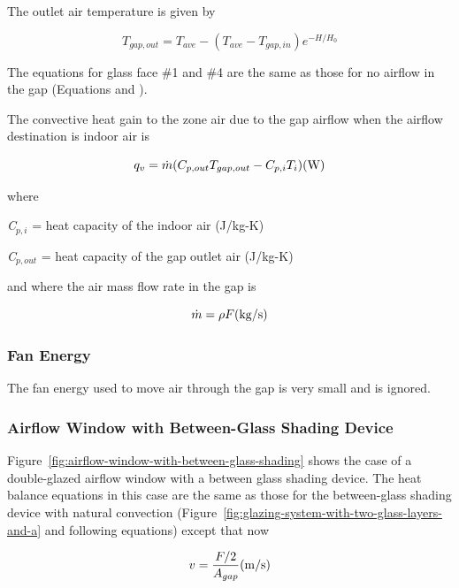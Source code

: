 The outlet air temperature is given by

\begin{equation}
{T_{gap,out}} = {T_{ave}} - ({T_{ave}} - {T_{gap,in}}){e^{ - H/{H_0}}}
\end{equation}

The equations for glass face \#1 and \#4 are the same as those for no airflow in the gap (Equations and ).

The convective heat gain to the zone air due to the gap airflow when the airflow destination is indoor air is

\begin{equation}
{q_v} = \dot m({C_{p,out}}{T_{gap,out}} - {C_{p,i}}{T_i}){\rm{      (W)}}
\end{equation}

where

\emph{C\(_{p,i}\)} = heat capacity of the indoor air (J/kg-K)

\emph{C\(_{p,out}\)} = heat capacity of the gap outlet air (J/kg-K)

and where the air mass flow rate in the gap is

\begin{equation}
\dot m = \rho F{\rm{      (kg/s)}}
\end{equation}

\subsubsection{Fan Energy}\label{fan-energy}

The fan energy used to move air through the gap is very small and is ignored.

\subsubsection{Airflow Window with Between-Glass Shading Device}\label{airflow-window-with-between-glass-shading-device}

Figure~\ref{fig:airflow-window-with-between-glass-shading} shows the case of a double-glazed airflow window with a between glass shading device. The heat balance equations in this case are the same as those for the between-glass shading device with natural convection (Figure~\ref{fig:glazing-system-with-two-glass-layers-and-a} and following equations) except that now

\begin{equation}
v = \frac{{F/2}}{{{A_{gap}}}}{\rm{      (m/s)}}
\end{equation}


